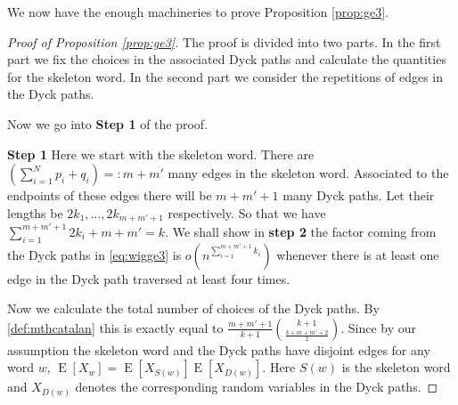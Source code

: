 \documentclass[12pt]{article}
\numberwithin{equation}{section}
\numberwithin{equation}{section}
\theoremstyle{definition}
\DeclareMathOperator{\E}{E} \DeclareMathOperator{\var}{Var}
\renewcommand{\1}{\bf 1}
\begin{document}
We now have the enough machineries to prove Proposition \ref{prop:ge3}. 
\begin{proof}[Proof of Proposition \ref{prop:ge3}]
The proof is divided into two parts. In the first part we fix the choices in the associated Dyck paths and calculate the quantities for the skeleton word. In the second part we consider the repetitions of edges in the Dyck paths. 


\noindent
Now we go into \textbf{Step 1} of the proof.

\noindent 
\textbf{Step 1}
Here we start with the skeleton word. There are $\left(\sum_{i=1}^{N}p_{i}+q_{i}\right)=: m+m'$ many edges in the skeleton word. Associated to the endpoints of these edges there will be $m+m'+1$ many Dyck paths. Let their lengths be $2k_{1},\ldots, 2k_{m+m'+1}$ respectively. So that we have $\sum_{i=1}^{m+m'+1} 2k_{i}+ m+m'= k$. We shall show in \textbf{step 2} the factor coming from the Dyck paths in \eqref{eq:wigge3} is $o(n^{\sum_{i=1}^{m+m'+1}k_{i}})$ whenever there is at least one edge in the Dyck path traversed at least four times. 

Now we calculate the total number of choices of the Dyck paths. By \eqref{def:mthcatalan} this is exactly equal to $\frac{m+m'+1}{k+1}\binom{k+1}{\frac{k+m+m' +2}{2}}$. Since by our assumption the  skeleton word and the Dyck paths have disjoint edges for any word $w$, $\E[X_{w}]= \E[X_{S(w)}]\E[X_{D(w)}]$. Here  $S(w)$ is the skeleton word and $X_{D(w)}$ denotes the corresponding random variables in the Dyck paths. 


\end{proof}
\end{document}
